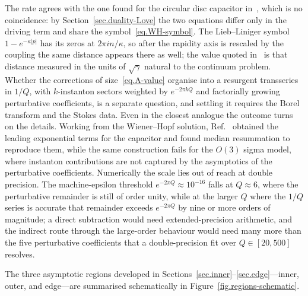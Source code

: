 \documentclass[11pt,a4paper]{article}
\theoremstyle{definition}
\begin{document}
The rate agrees with the one found for the circular disc capacitor
in~\cite{BajnokBalogHegedusVona2022}, which is no coincidence: by
Section~\ref{sec.duality-Love} the two equations differ only in the driving
term and share the symbol~\eqref{eq.WH-symbol}.  The Lieb--Liniger symbol
$1 - e^{-\kappa|p|}$ has its zeros at $2\pi i n/\kappa$, so after the rapidity
axis is rescaled by the coupling the same distance appears there as well; the
value quoted in~\cite{MarinoReis2019} is that distance measured in the units of
$\sqrt{\gamma}$ natural to the continuum problem.  Whether the corrections
of size~\eqref{eq.A-value} organise into a resurgent transseries in $1/Q$, with
$k$-instanton sectors weighted by $e^{-2\pi k Q}$ and factorially growing
perturbative coefficients, is a separate question, and settling it requires the
Borel transform and the Stokes data.  Even in the closest analogue the outcome
turns on the details.  Working from the Wiener--Hopf solution,
Ref.~\cite{BajnokBalogHegedusVona2022} obtained the leading exponential terms
for the capacitor and found median resummation to reproduce them, while the
same construction fails for the $O(3)$ sigma model, where instanton
contributions are not captured by the asymptotics of the perturbative
coefficients.  Numerically the scale lies out of reach at double precision.  The
machine-epsilon threshold $e^{-2\pi Q}\approx10^{-16}$ falls at $Q\approx6$,
where the perturbative remainder is still of order unity, while at the larger
$Q$ where the $1/Q$ series is accurate that remainder exceeds $e^{-2\pi Q}$ by
nine or more orders of magnitude; a direct subtraction would need
extended-precision arithmetic, and the indirect route through the large-order
behaviour would need many more than the five perturbative coefficients that a
double-precision fit over $Q\in[20,500]$ resolves.

The three asymptotic regions developed in Sections~\ref{sec.inner}--\ref{sec.edge}---inner, outer, and edge---are summarised schematically in Figure~\ref{fig.regions-schematic}.
\end{document}

